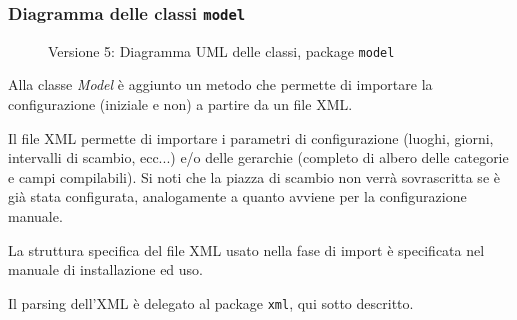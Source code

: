 \subsubsection{Diagramma delle classi \texttt{model}}
\vspace{0.5cm}
\begin{figure}[H]
    \centering
    \caption{Versione 5: Diagramma UML delle classi, package \texttt{model}}
    \label{fig:class_model_v_5}
\end{figure}

Alla classe \textit{Model} è aggiunto un metodo che permette di importare la configurazione (iniziale e non) a partire da un file XML.

Il file XML permette di importare i parametri di configurazione (luoghi, giorni, intervalli di scambio, ecc...) e/o delle gerarchie (completo di albero delle categorie e campi compilabili).
Si noti che la piazza di scambio non verrà sovrascritta se è già stata configurata, analogamente a quanto avviene per la configurazione manuale.

La struttura specifica del file XML usato nella fase di import è specificata nel manuale di installazione ed uso.

Il parsing dell'XML è delegato al package \texttt{xml}, qui sotto descritto.
